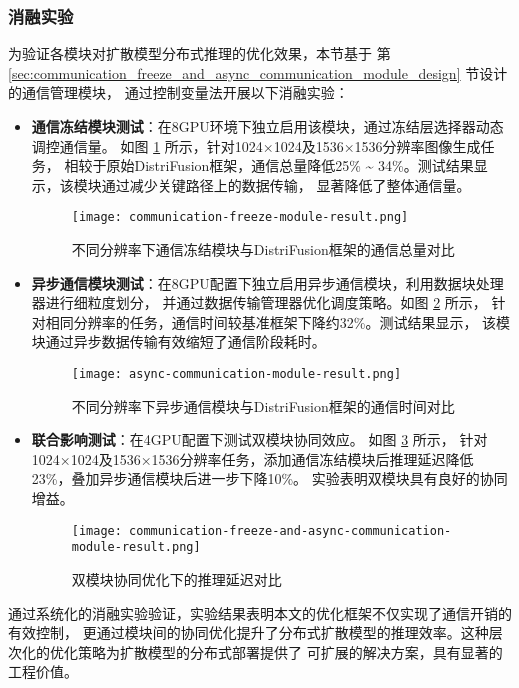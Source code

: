 \subsubsection{消融实验}
为验证各模块对扩散模型分布式推理的优化效果，本节基于
第 \ref{sec:communication_freeze_and_async_communication_module_design} 节设计的通信管理模块，
通过控制变量法开展以下消融实验：

\begin{itemize}
\item \textbf{通信冻结模块测试}：在8GPU环境下独立启用该模块，通过冻结层选择器动态调控通信量。
如图 \ref{fig:communication-freeze-module-result} 所示，针对1024×1024及1536×1536分辨率图像生成任务，
相较于原始DistriFusion框架，通信总量降低25\% \~{} 34\%。测试结果显示，该模块通过减少关键路径上的数据传输，
显著降低了整体通信量。
\begin{figure}[ht]
\centering
\texttt{[image: communication-freeze-module-result.png]}
\caption{不同分辨率下通信冻结模块与DistriFusion框架的通信总量对比}
\label{fig:communication-freeze-module-result}
\end{figure}

\item \textbf{异步通信模块测试}：在8GPU配置下独立启用异步通信模块，利用数据块处理器进行细粒度划分，
并通过数据传输管理器优化调度策略。如图 \ref{fig:async-communication-module-result} 所示，
针对相同分辨率的任务，通信时间较基准框架下降约32\%。测试结果显示，
该模块通过异步数据传输有效缩短了通信阶段耗时。
\begin{figure}[ht]
\centering
\texttt{[image: async-communication-module-result.png]}
\caption{不同分辨率下异步通信模块与DistriFusion框架的通信时间对比}
\label{fig:async-communication-module-result}
\end{figure}

\item \textbf{联合影响测试}：在4GPU配置下测试双模块协同效应。
如图 \ref{fig:communication-freeze-and-async-communication-module-result} 所示，
针对1024×1024及1536×1536分辨率任务，添加通信冻结模块后推理延迟降低23\%，叠加异步通信模块后进一步下降10\%。
实验表明双模块具有良好的协同增益。
\begin{figure}[ht]
\centering
\texttt{[image: communication-freeze-and-async-communication-module-result.png]}
\caption{双模块协同优化下的推理延迟对比}
\label{fig:communication-freeze-and-async-communication-module-result}
\end{figure}
\end{itemize}
\par
通过系统化的消融实验验证，实验结果表明本文的优化框架不仅实现了通信开销的有效控制，
更通过模块间的协同优化提升了分布式扩散模型的推理效率。这种层次化的优化策略为扩散模型的分布式部署提供了
可扩展的解决方案，具有显著的工程价值。

